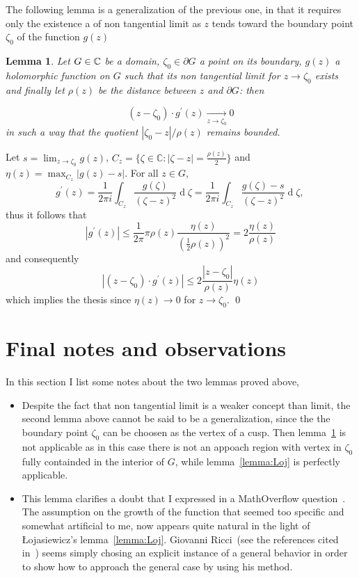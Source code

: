 \documentclass[a4paper,10pt]{article}
\newtheorem{lemma}{Lemma}
\begin{document}
The following lemma is a generalization of the previous one, in that it requires only the existence a of non tangential limit as $z$ tends toward the boundary point $\zeta_0$ of the function $g(z)$ 

\begin{lemma}\label{lemma:main} Let $G\in\Bbb C$ be a domain, $\zeta_0 \in\partial G$ a point on its boundary, $g(z)$ a holomorphic function on $G$ such that its non tangential limit for $z \to\zeta_0$ exists and finally let $\rho(z)$ be the distance between $z$ and $\partial G$: then

$$
\left(z-\zeta_0\right) \cdot g^{\prime}(z) \underset{z \to \zeta_0}{\longrightarrow} 0
$$
in such a way that the quotient $\left|\zeta_0-z\right| / \rho(z)$ remains bounded.
\end{lemma}
\proof Let  $s=\lim _{z \to\zeta_0} g(z)$, $C_z=\big\{\zeta \in \mathbb{C} :| \zeta-z \mid=\frac{\rho(z)}{2}\big\}$ and $\eta(z)=\max _{{C}_z}|g(z)-s|$. For all $z \in G$,
$$
g^{\prime}(z)=\frac{1}{2 \pi i} \int_{C_z} \frac{g(\zeta)}{(\zeta-z)^2} \operatorname{d}\!\zeta=\frac{1}{2 \pi i} \int_{C_z}\frac{g(\zeta)-s}{(\zeta-z)^2} \operatorname{d}\! \zeta \text {, }
$$
thus it follows that
$$
\left|g^{\prime}(z)\right| \leqslant \frac{1}{2 \pi} \pi \rho(z) \frac{\eta(z)}{\left(\frac{1}{2} \rho(z)\right)^2}=2 \frac{\eta(z)}{\rho(z)}
$$
and consequently
$$
\left|\left(z-\zeta_0\right) \cdot g^{\prime}(z)\right| \leqslant 2 \frac{\left|z-\zeta_0\right|}{\rho(z)} \eta(z)
$$
which implies the thesis since $\eta(z) \to 0$ for $z \to \zeta_0$. \qed

\section{Final notes and observations}
In this section I list some notes about the two lemmas proved above,
\begin{itemize}
\item Despite the fact that non tangential limit is a weaker concept than limit, the second lemma above cannot be said to be a generalization, since the the boundary point $\zeta_0$ can be choosen as the vertex of a cusp. Then lemma~\ref{lemma:main} is not applicable as in this case there is not an appoach region with vertex in $\zeta_0$ fully containded in the interior of $G$, while lemma~\ref{lemma:Loj} is perfectly applicable.
\item This lemma clarifies a doubt that I expressed in a MathOverflow question~\cite{396814}. The assumption on the growth of the function that seemed too specific and somewhat artificial to me, now appears quite natural in the light of Łojasiewicz's lemma~\ref{lemma:Loj}. Giovanni Ricci~(see the references cited in~\cite{396814}) seems simply chosing an explicit instance of a general behavior in order to show how to approach the general case by using his method.
\end{itemize}



\end{document}
